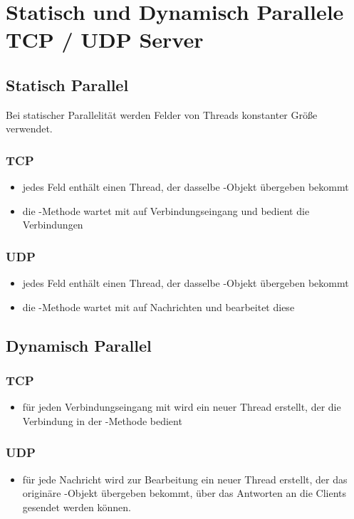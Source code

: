 \section{Statisch und Dynamisch Parallele TCP / UDP Server}

\subsection{Statisch Parallel}

Bei statischer Parallelität werden Felder von Threads konstanter Größe verwendet.
\subsubsection{TCP}

\begin{itemize}
    \item jedes Feld enthält einen Thread, der dasselbe -Objekt übergeben bekommt
    \item die -Methode wartet mit  auf Verbindungseingang und bedient die Verbindungen
\end{itemize}


\subsubsection{UDP}

\begin{itemize}
    \item jedes Feld enthält einen Thread, der dasselbe -Objekt übergeben bekommt
    \item die -Methode wartet mit  auf Nachrichten und bearbeitet diese
\end{itemize}

\subsection{Dynamisch Parallel}


\subsubsection{TCP}

\begin{itemize}
    \item für jeden Verbindungseingang mit  wird ein neuer Thread erstellt, der die Verbindung in der -Methode
    bedient
\end{itemize}


\subsubsection{UDP}

\begin{itemize}
    \item für jede Nachricht wird zur Bearbeitung ein neuer Thread erstellt, der das originäre -Objekt übergeben bekommt,
    über das Antworten an die Clients gesendet werden können.
\end{itemize}
